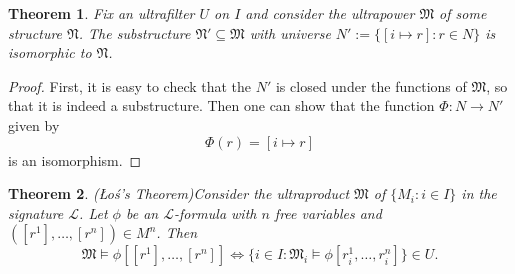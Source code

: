 \documentclass[leqno]{article}
\newtheorem{theorem}{Theorem}[section]
\theoremstyle{remark}
\newcommand{\set}[1]{\{#1\}}
\newcommand{\lang}{\mathcal{L}}
\newcommand{\struct}[1]{\mathfrak{#1}}
\begin{document}
\begin{theorem}
    Fix an ultrafilter $U$ on $I$ and consider the ultrapower $\struct{M}$ of some structure $\struct{N}$. The substructure $\struct{N}' \subseteq \struct{M}$ with universe $N' := \set{[i \mapsto r] : r \in N}$ is isomorphic to $\struct{N}$.
\end{theorem}

\begin{proof}
    First, it is easy to check that the $N'$ is closed under the functions of $\struct{M}$, so that it is indeed a substructure. Then one can show that the function $\Phi : N \to N'$ given by
    \begin{equation*}
        \Phi (r) = [i \mapsto r]
    \end{equation*} is an isomorphism.
\end{proof}

\begin{theorem}{(\L o\'s's Theorem)}\label{thm:los}
    Consider the ultraproduct $\struct{M}$ of $\set{M_i : i \in I}$ in the signature $\lang$. Let $\phi$ be an $\lang$-formula with $n$ free variables and $([r^1], \dots, [r^n]) \in M^n$. Then 
    \begin{equation*}
        \struct{M} \models \phi[[r^1], \dots, [r^n]] \iff \set{i \in I : \struct{M}_i \models \phi [r^1_i, \dots, r^n_i]} \in U.
    \end{equation*}
\end{theorem}
\end{document}
